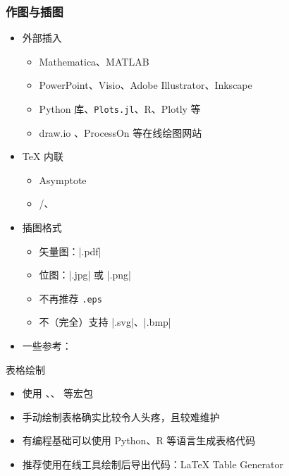     \begin{frame}[fragile]
      \frametitle{作图与插图}
      \begin{itemize}
        \item 外部插入
    
          \begin{itemize}
            \item Mathematica、MATLAB
            \item PowerPoint、Visio、Adobe Illustrator、Inkscape
            \item Python  库、\texttt{Plots.jl}、R、Plotly 等
            \item draw.io 、ProcessOn  等在线绘图网站
          \end{itemize}
    
        \item \TeX{} 内联
    
          \begin{itemize}
            \item Asymptote
            \item \alert{/、}
          \end{itemize}
    
        \item 插图格式
    
          \begin{itemize}
            \item 矢量图：|.pdf|
            \item 位图：|.jpg| 或 |.png|
            \item \alert{不再推荐 \texttt{.eps}}
            \item 不（完全）支持 |.svg|、|.bmp|
          \end{itemize}
    
        \item 一些参考：
      \end{itemize}
    \end{frame}
    
    \begin{frame}[fragile]{表格绘制}
      \begin{itemize}
        \item 使用 、、 等宏包
        \item 手动绘制表格确实比较令人头疼，且较难维护
        \item 有编程基础可以使用 Python、R 等语言生成表格代码
        \item 推荐使用在线工具绘制后导出代码：\LaTeX{} Table Generator 
      \end{itemize}
    \end{frame}

